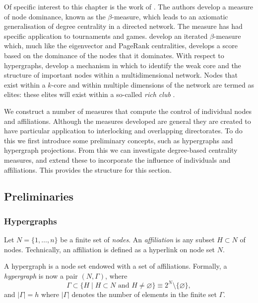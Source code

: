 Of specific interest to this chapter is the work of \citet{BrinkGilles1996, BrinkGilles2000}. The authors develop a measure of node dominance, known as the $\beta$-measure, which leads to an axiomatic generalisation of degree centrality in a directed network. The measure has had specific application to tournaments and games. \citet{BormBrink2002} develop an iterated $\beta$-measure which, much like the eigenvector and PageRank centralities, develops a score based on the dominance of the nodes that it dominates. With respect to hypergraphs, \citet{Corominas-MurtraThurner2014} develop a mechanism in which to identify the weak core and the structure of important nodes within a multidimensional network. Nodes that exist within a $k$-core and within multiple dimensions of the network are termed as elites: these elites will exist within a so-called \emph{rich club} \citep{Colizza2006}.

We construct a number of measures that compute the control of individual nodes and affiliations. Although the measures developed are general they are created to have particular application to interlocking and overlapping directorates. To do this we first introduce some preliminary concepts, such as hypergraphs and hypergraph projections. From this we can investigate degree-based centrality measures, and extend these to incorporate the influence of individuals and affiliations. This provides the structure for this section.

\subsection{Preliminaries}

\subsubsection*{Hypergraphs}

Let $N = \{ 1, \ldots ,n \}$ be a finite set of \emph{nodes}. An \emph{affiliation} is any subset $H \subset N$ of nodes. Technically, an affiliation is defined as a hyperlink on node set $N$.

A hypergraph is a node set endowed with a set of affiliations. Formally, a \emph{hypergraph} is now a pair $(N, \Gamma )$, where
\begin{equation}
\Gamma \subset \{ H \mid H \subset N \mbox{ and } H \neq \varnothing \} \equiv 2^N \setminus \{\varnothing\} ,
\end{equation}
and $| \Gamma | = h$ where $| \Gamma |$ denotes the number of elements in the finite set $\Gamma$.

